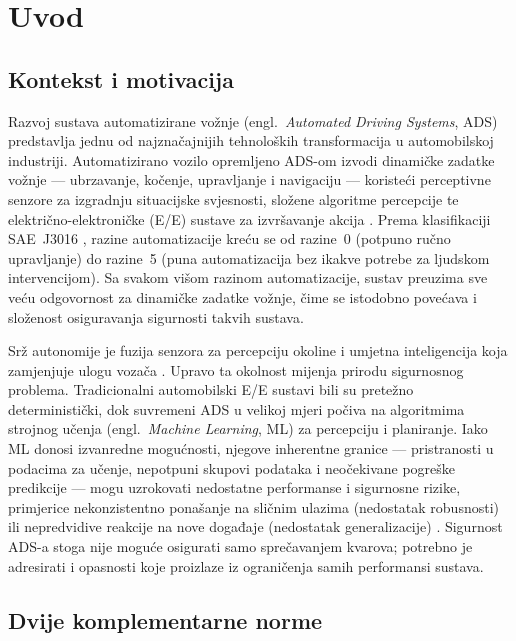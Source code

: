 \section{Uvod}
\label{sec:uvod}

\subsection{Kontekst i motivacija}

Razvoj sustava automatizirane vožnje (engl.\ \textit{Automated Driving Systems}, ADS) predstavlja jednu od najznačajnijih tehnoloških transformacija u automobilskoj industriji. Automatizirano vozilo opremljeno ADS-om izvodi dinamičke zadatke vožnje — ubrzavanje, kočenje, upravljanje i navigaciju — koristeći perceptivne senzore za izgradnju situacijske svjesnosti, složene algoritme percepcije te električno-elektroničke (E/E) sustave za izvršavanje akcija \cite{patel2025sotifslr}. Prema klasifikaciji SAE~J3016 \cite{saej3016}, razine automatizacije kreću se od razine~0 (potpuno ručno upravljanje) do razine~5 (puna automatizacija bez ikakve potrebe za ljudskom intervencijom). Sa svakom višom razinom automatizacije, sustav preuzima sve veću odgovornost za dinamičke zadatke vožnje, čime se istodobno povećava i složenost osiguravanja sigurnosti takvih sustava.

Srž autonomije je fuzija senzora za percepciju okoline i umjetna inteligencija koja zamjenjuje ulogu vozača \cite{hrgetic2025uvod}. Upravo ta okolnost mijenja prirodu sigurnosnog problema. Tradicionalni automobilski E/E sustavi bili su pretežno deterministički, dok suvremeni ADS u velikoj mjeri počiva na algoritmima strojnog učenja (engl.\ \textit{Machine Learning}, ML) za percepciju i planiranje. Iako ML donosi izvanredne mogućnosti, njegove inherentne granice — pristranosti u podacima za učenje, nepotpuni skupovi podataka i neočekivane pogreške predikcije — mogu uzrokovati nedostatne performanse i sigurnosne rizike, primjerice nekonzistentno ponašanje na sličnim ulazima (nedostatak robusnosti) ili nepredvidive reakcije na nove događaje (nedostatak generalizacije) \cite{patel2025sotifslr}. Sigurnost ADS-a stoga nije moguće osigurati samo sprečavanjem kvarova; potrebno je adresirati i opasnosti koje proizlaze iz ograničenja samih performansi sustava.

\subsection{Dvije komplementarne norme}

